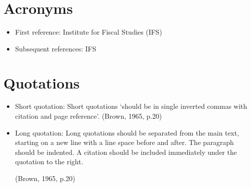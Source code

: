 \documentclass{OUP-EJ}
\begin{document}
\enlargethispage*{96pt}%
\section{Acronyms}

\begin{itemize}
\item First reference: Institute for Fiscal Studies (IFS)
\item Subsequent references: IFS
\end{itemize}

\section{Quotations}
\begin{itemize}
\item Short quotation: Short quotations `should be in single inverted commas with citation
and page reference'. (Brown, 1965, p.20)

\item Long quotation: Long quotations should be separated from the main text, starting on a
new line with a line space before and after. The paragraph should be indented. A
citation should be included immediately under the quotation to the right.

\hfill (Brown, 1965, p.20)
\end{itemize}
\end{document}
